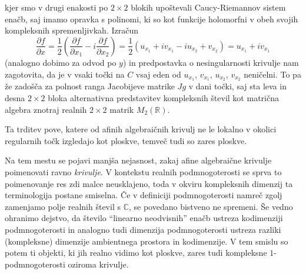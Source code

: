 \documentclass[mat1]{fmfdelo}
\newcommand{\R}{\mathbb R}
\newcommand{\C}{\mathbb C}
\newcommand{\pdv}[2][]{\frac{\partial#1}{\partial#2}}
\theoremstyle{definition}
\begin{document}
\begin{dokaz}
    \\  
    \\ 

    kjer smo v drugi enakosti po $2 \times 2$ blokih upoštevali Caucy-Riemannov sistem enačb, saj imamo opravka s polinomi, ki so kot funkcije holomorfni v obeh svojih kompleksnih spremenljivkah. Izračun
    \[
        \pdv[f]{x} = \frac{1}{2} \left( \pdv[f]{x_1} - i\pdv[f]{x_2}\right) = \frac{1}{2} \left( u_{x_1} + i v_{x_1} - i u_{x_2} + v_{x_2}\right) = u_{x_1} + iv_{x_1}
    \]
    (analogno dobimo za odvod po $y$) in predpostavka o nesingularnosti krivulje nam zagotovita, da je v vsaki točki na $C$ vsaj eden od $u_{x_1}$, $v_{x_1}$, $u_{x_2}$, $v_{x_2}$ neničelni. To pa že zadošča za polnost ranga Jacobijeve matrike $Jg$ v dani točki, saj sta leva in desna $2 \times 2$ bloka alternativna predstavitev kompleksnih števil kot matrična algebra znotraj realnih $2 \times2$ matrik $M_2(\R)$.  
\end{dokaz}

Ta trditev pove, katere od afinih algebraičnih krivulj ne le lokalno v okolici regularnih točk izgledajo kot ploskve, temveč tudi so zares ploskve. 
\\
\par
Na tem mestu se pojavi manjša nejasnost, zakaj afine algebraične krivulje poimenovati ravno \emph{krivulje}. V kontekstu realnih podmnogoterosti se sprva to poimenovanje res zdi malce neusklajeno, toda v okviru kompleksnih dimenzij ta terminologija postane smiselna. Če v definiciji podmnogoterosti namreč zgolj zamenjamo polje realnih števil s $\C$, se povedano bistveno ne spremeni. Še vedno ohranimo dejstvo, da število ``linearno neodvisnih'' enačb ustreza kodimenziji podmnogoterosti in analogno tudi dimenzija podmnogoterosti ustreza razliki (kompleksne) dimenzije ambientnega prostora in kodimenzije. V tem smislu so potem ti objekti, ki jih realno vidimo kot ploskve, zares tudi kompleksne $1$-podmnogoterosti oziroma krivulje.
\end{document}
